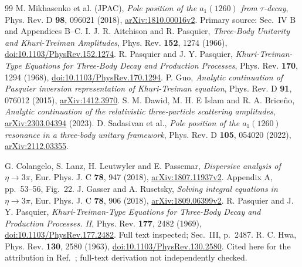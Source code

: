 \documentclass[11pt,a4paper]{article}
\begin{document}
\begin{thebibliography}{99}
 M. Mikhasenko et al. (JPAC), \emph{Pole position of the $a_1(1260)$ from $\tau$-decay}, Phys. Rev. D \textbf{98}, 096021 (2018), \href{https://arxiv.org/abs/1810.00016v2}{arXiv:1810.00016v2}. Primary source: Sec.~IV B and Appendices B--C.
 I. J. R. Aitchison and R. Pasquier, \emph{Three-Body Unitarity and Khuri-Treiman Amplitudes}, Phys. Rev. \textbf{152}, 1274 (1966), \href{https://doi.org/10.1103/PhysRev.152.1274}{doi:10.1103/PhysRev.152.1274}.
 R. Pasquier and J. Y. Pasquier, \emph{Khuri-Treiman-Type Equations for Three-Body Decay and Production Processes}, Phys. Rev. \textbf{170}, 1294 (1968), \href{https://doi.org/10.1103/PhysRev.170.1294}{doi:10.1103/PhysRev.170.1294}.
 P. Guo, \emph{Analytic continuation of Pasquier inversion representation of Khuri-Treiman equation}, Phys. Rev. D \textbf{91}, 076012 (2015), \href{https://arxiv.org/abs/1412.3970}{arXiv:1412.3970}.
 S. M. Dawid, M. H. E Islam and R. A. Brice\~no, \emph{Analytic continuation of the relativistic three-particle scattering amplitudes}, \href{https://arxiv.org/abs/2303.04394}{arXiv:2303.04394} (2023).
 D. Sadasivan et al., \emph{Pole position of the $a_1(1260)$ resonance in a three-body unitary framework}, Phys. Rev. D \textbf{105}, 054020 (2022), \href{https://arxiv.org/abs/2112.03355}{arXiv:2112.03355}.

 G. Colangelo, S. Lanz, H. Leutwyler and E. Passemar, \emph{Dispersive analysis of $\eta\to3\pi$}, Eur. Phys. J. C \textbf{78}, 947 (2018), \href{https://arxiv.org/abs/1807.11937}{arXiv:1807.11937v2}. Appendix A, pp.~53--56, Fig.~22.
 J. Gasser and A. Rusetsky, \emph{Solving integral equations in $\eta\to3\pi$}, Eur. Phys. J. C \textbf{78}, 906 (2018), \href{https://arxiv.org/abs/1809.06399}{arXiv:1809.06399v2}.
 R. Pasquier and J. Y. Pasquier, \emph{Khuri-Treiman-Type Equations for Three-Body Decay and Production Processes. II}, Phys. Rev. \textbf{177}, 2482 (1969), \href{https://doi.org/10.1103/PhysRev.177.2482}{doi:10.1103/PhysRev.177.2482}. Full text inspected; Sec.~III, p.~2487.
 R. C. Hwa, Phys. Rev. \textbf{130}, 2580 (1963), \href{https://doi.org/10.1103/PhysRev.130.2580}{doi:10.1103/PhysRev.130.2580}. Cited here for the attribution in Ref.~\cite{paper}; full-text derivation not independently checked.
\end{thebibliography}
\end{document}
